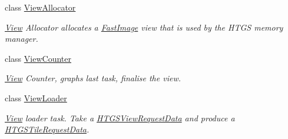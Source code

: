 \begin{DoxyCompactItemize}
class \hyperlink{classfi_1_1ViewAllocator}{View\+Allocator}
\begin{DoxyCompactList}\small\item\em \hyperlink{classfi_1_1View}{View} Allocator allocates a \hyperlink{classfi_1_1FastImage}{Fast\+Image} view that is used by the H\+T\+GS memory manager. \end{DoxyCompactList}\item 
class \hyperlink{classfi_1_1ViewCounter}{View\+Counter}
\begin{DoxyCompactList}\small\item\em \hyperlink{classfi_1_1View}{View} Counter, graph\textquotesingle{}s last task, finalise the view. \end{DoxyCompactList}\item 
class \hyperlink{classfi_1_1ViewLoader}{View\+Loader}
\begin{DoxyCompactList}\small\item\em \hyperlink{classfi_1_1View}{View} loader task. Take a \hyperlink{classfi_1_1HTGSViewRequestData}{H\+T\+G\+S\+View\+Request\+Data} and produce a \hyperlink{classfi_1_1HTGSTileRequestData}{H\+T\+G\+S\+Tile\+Request\+Data}. \end{DoxyCompactList}\end{DoxyCompactItemize}
